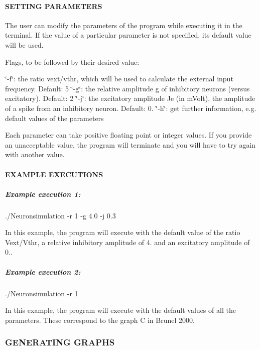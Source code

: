 \paragraph*{S\+E\+T\+T\+I\+NG P\+A\+R\+A\+M\+E\+T\+E\+RS}

The user can modify the parameters of the program while executing it in the terminal. If the value of a particular parameter is not specified, its default value will be used.

Flags, to be followed by their desired value\+:

\char`\"{}-\/f\char`\"{}\+: the ratio vext/vthr, which will be used to calculate the external input frequency. Default\+: 5 \char`\"{}-\/g\char`\"{}\+: the relative amplitude g of inhibitory neurons (versus excitatory). Default\+: 2 \char`\"{}-\/j\char`\"{}\+: the excitatory amplitude Je (in m\+Volt), the amplitude of a spike from an inhibitory neuron. Default\+: 0. \char`\"{}-\/h\char`\"{}\+: get further information, e.\+g. default values of the parameters

Each parameter can take positive floating point or integer values. If you provide an unacceptable value, the program will terminate and you will have to try again with another value.

\paragraph*{E\+X\+A\+M\+P\+LE E\+X\+E\+C\+U\+T\+I\+O\+NS}

\subparagraph*{Example execution 1\+:}

\begin{DoxyVerb}    ./Neuronsimulation -r 1 -g 4.0 -j 0.3
\end{DoxyVerb}


In this example, the program will execute with the default value of the ratio Vext/\+Vthr, a relative inhibitory amplitude of 4. and an excitatory amplitude of 0..

\subparagraph*{Example execution 2\+:}

\begin{DoxyVerb}    ./Neuronsimulation -r 1
\end{DoxyVerb}


In this example, the program will execute with the default values of all the parameters. These correspond to the graph C in Brunel 2000.

\subsubsection*{G\+E\+N\+E\+R\+A\+T\+I\+NG G\+R\+A\+P\+HS}

